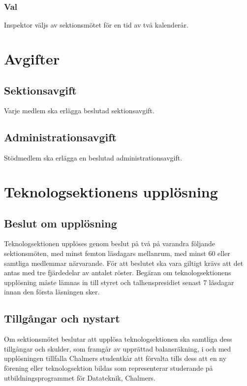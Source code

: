 \documentclass[a4paper]{dtek}
\begin{document}
\subsubsection{Val}
Inspektor väljs av sektionsmötet för en tid av två kalenderår.
\newpage

\section{Avgifter}
\subsection{Sektionsavgift}
Varje medlem ska erlägga beslutad sektionsavgift.
\subsection{Administrationsavgift}
Stödmedlem ska erlägga en beslutad administrationsavgift.
\newpage

\section{Teknologsektionens upplösning}
\subsection{Beslut om upplösning}
Teknologsektionen upplöses genom beslut på två på varandra följande sektionsmöten, med minst femton läsdagars mellanrum, med minst 60 eller samtliga medlemmar närvarande. För att beslutet ska vara giltigt krävs att det antas med tre fjärdedelar av antalet röster. Begäran om teknologsektionens upplösning måste lämnas in till styret och talhenspresidiet senast 7 läsdagar innan den första läsningen sker.
\subsection{Tillgångar och nystart}
Om sektionsmötet beslutar att upplösa teknologsektionen ska samtliga dess tillgångar och skulder, som framgår av upprättad balansräkning, i och med upplösningen tillfalla Chalmers studentkår att förvalta tills dess att en ny förening eller teknologsektion bildas som representerar studerande på utbildningsprogrammet för Datateknik, Chalmers.
\newpage

\end{document}
